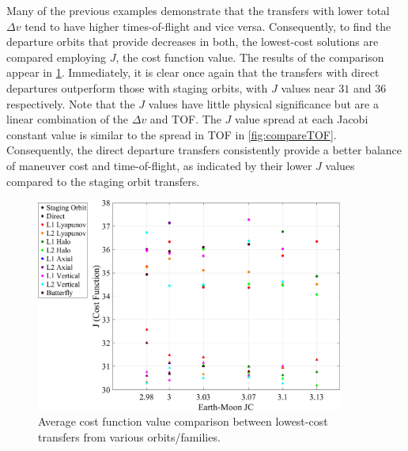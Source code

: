 Many of the previous examples demonstrate that the transfers with lower total $\Delta v$ tend to
have higher times-of-flight and vice versa. Consequently, to find the departure orbits that provide
decreases in both, the lowest-cost solutions are compared employing $J$, the cost function value.
The results of the comparison appear in \cref{fig:compareJ}. Immediately, it is clear once again
that the transfers with direct departures outperform those with staging orbits, with $J$ values
near $31$ and $36$ respectively. Note that the $J$ values have little physical significance but are
a linear combination of the $\Delta v$ and TOF. The $J$ value spread at each Jacobi constant value
is similar to the spread in TOF in \cref{fig:compareTOF}. Consequently, the direct departure
transfers consistently provide a better balance of maneuver cost and time-of-flight, as indicated
by their lower $J$ values compared to the staging orbit transfers.

\begin{figure}[H]
    \centering
    \includegraphics[width=0.9\textwidth]{figures/JComparison.pdf}
    \caption{Average cost function value comparison between lowest-cost transfers from various orbits/families.}
    \label{fig:compareJ}
\end{figure}

